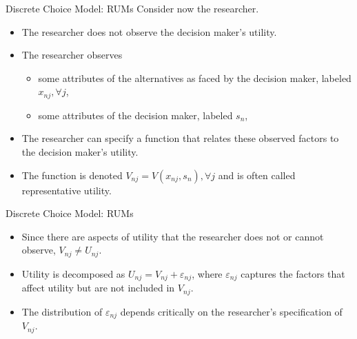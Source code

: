\begin{frame}{Discrete Choice Model: RUMs}
Consider now the researcher.
\begin{itemize}
\item The researcher does not observe the decision maker's utility.
\item The researcher observes
    \begin{itemize}
    \item some attributes of the alternatives as faced by the decision maker, labeled $x_{n j}, \forall j$,
    \item some attributes of the decision maker, labeled $s_n$,
    \end{itemize}
\item The researcher can specify a function that relates these observed factors to the decision maker's utility.
\item The function is denoted $V_{n j}=V\left(x_{n j}, s_n\right), \forall j$ and is often called representative utility.
\end{itemize}
\end{frame}


\begin{frame}{Discrete Choice Model: RUMs}
\begin{itemize}
\item Since there are aspects of utility that the researcher does not or cannot observe, $V_{n j} \neq U_{n j}$.
\item Utility is decomposed as $U_{n j}=V_{n j}+\varepsilon_{n j}$, where $\varepsilon_{n j}$ captures the factors that affect utility but are not included in $V_{n j}$.
\item The distribution of $\varepsilon_{n j}$ depends critically on the researcher's specification of $V_{n j}$.
\end{itemize}
\end{frame}



